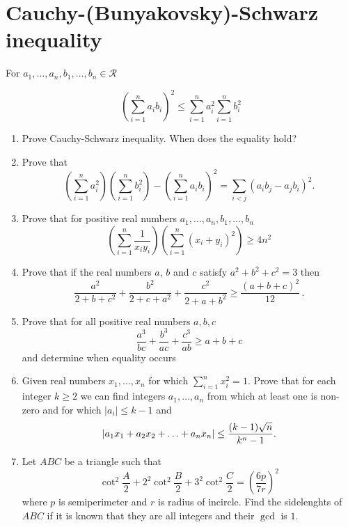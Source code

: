 \documentclass{article}
\begin{document}
\section{Cauchy-(Bunyakovsky)-Schwarz inequality}
For $a_1, \dots , a_n, b_1, \dots , b_n \in \mathcal{R}$

$$\left(\sum_{i=1}^{n} a_i b_i\right)^2 \leq \sum_{i=1}^{n} a_i^2 \sum_{i=1}^{n} b_i^2 $$

\begin{enumerate}
	\item
	Prove Cauchy-Schwarz inequality. When does the equality hold?
	
	\item
	Prove that
	$$
	\left(\sum _{i=1}^{n}a_{i}^{2}\right) \left(\sum _{i=1}^{n}b_{i}^{2}\right)-
	\left( \sum ^{n}_{i=1}a_{i}b_{i}\right) ^{2}=
	\sum_{i< j}(a_ib_j-a_jb_i)^2.
	$$

	
	\item %
	Prove that for positive real numbers $a_1,\dots,a_n,b_1,\dots,b_n$
	$$\left(\sum_{i=1}^{n} \frac{1}{x_iy_i}\right)\left(\sum_{i=1}^{n}(x_i+y_i)^2\right)
	\geq
	4n^2
	$$
	
	
	\item %
	Prove that if the real numbers $a$, $b$ and $c$ satisfy $a^2+b^2+c^2=3$ then
	$$\frac{a^2}{2+b+c^2}+\frac{b^2}{2+c+a^2}+\frac{c^2}{2+a+b^2}
	\ge\frac{(a+b+c)^2}{12}\,.
	$$
	
	\item %
	
	Prove that for all positive real numbers $a, b, c$
	$$\frac{a^3}{bc} + \frac{b^3}{ac} + \frac{c^3}{ab}  \geq a+b+c $$
	and determine when equality occurs


	\item %
	Given real numbers $x_1,\dots,x_n$ for which $\sum_{i=1}^{n} x_i^2 =1$. Prove that for each integer $k \geq 2$ we can find integers $a_1,\dots,a_n$ from which at least one is non-zero and for which $|a_i| \leq k-1$ and 
	$$|a_1x_1 + a_2x_2 + \ldots + a_nx_n| \leq {{(k-1)\sqrt n}\over{k^n -1}}.$$
	
	\item %
	Let $ABC$ be a triangle such that 
	$$\cot^2 \frac{A}{2} + 2^2\cot^2 \frac{B}{2} +3^2\cot^2 \frac{C}{2}=\left(\frac{6p}{7r}\right)^2 $$
	where $p$ is semiperimeter and $r$ is radius of incircle. Find the sidelenghts of $ABC$ if it is known that they are all integers and their $\gcd$ is $1$. 


\end{enumerate}
\end{document}
